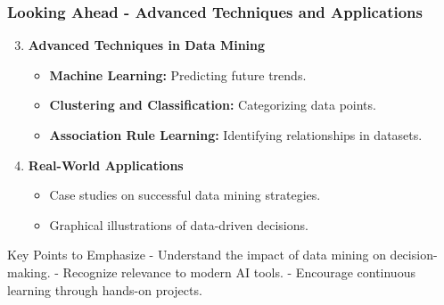 \documentclass[aspectratio=169]{beamer}
\begin{document}
\begin{frame}[fragile]
    \frametitle{Looking Ahead - Advanced Techniques and Applications}
    \begin{enumerate}
        \setcounter{enumi}{2}
        \item \textbf{Advanced Techniques in Data Mining}
        \begin{itemize}
            \item \textbf{Machine Learning:} Predicting future trends.
            \item \textbf{Clustering and Classification:} Categorizing data points.
            \item \textbf{Association Rule Learning:} Identifying relationships in datasets.
        \end{itemize}

        \item \textbf{Real-World Applications}
        \begin{itemize}
            \item Case studies on successful data mining strategies.
            \item Graphical illustrations of data-driven decisions.
        \end{itemize}
    \end{enumerate}

    \begin{block}{Key Points to Emphasize}
        - Understand the impact of data mining on decision-making.
        - Recognize relevance to modern AI tools.
        - Encourage continuous learning through hands-on projects.
    \end{block}
\end{frame}
\end{document}
